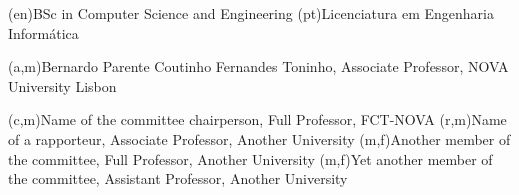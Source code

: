 \ntauthordegree(en){BSc in Computer Science and Engineering}
\ntauthordegree(pt){Licenciatura em Engenharia Informática}


(a,m){Bernardo Parente Coutinho Fernandes Toninho, Associate Professor, NOVA University Lisbon}

(c,m){Name of the committee chairperson, Full Professor, FCT-NOVA}
(r,m){Name of a rapporteur, Associate Professor, Another University}
(m,f){Another member of the committee, Full Professor, Another University}
(m,f){Yet another member of the committee, Assistant Professor, Another University}
